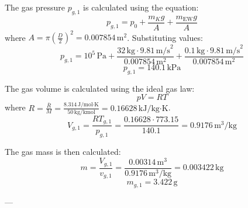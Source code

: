 The gas pressure \( p_{g,1} \) is calculated using the equation:  
\[
p_{g,1} = p_0 + \frac{m_K g}{A} + \frac{m_{\text{EW}} g}{A}
\]  
where \( A = \pi \left(\frac{D}{2}\right)^2 = 0.007854 \, \text{m}^2 \). Substituting values:  
\[
p_{g,1} = 10^5 \, \text{Pa} + \frac{32 \, \text{kg} \cdot 9.81 \, \text{m/s}^2}{0.007854 \, \text{m}^2} + \frac{0.1 \, \text{kg} \cdot 9.81 \, \text{m/s}^2}{0.007854 \, \text{m}^2}
\]  
\[
p_{g,1} = 140.1 \, \text{kPa}
\]  

The gas volume is calculated using the ideal gas law:  
\[
p V = R T
\]  
where \( R = \frac{\bar{R}}{M} = \frac{8.314 \, \text{J/mol·K}}{50 \, \text{kg/kmol}} = 0.16628 \, \text{kJ/kg·K} \).  
\[
V_{g,1} = \frac{R T_{g,1}}{p_{g,1}} = \frac{0.16628 \cdot 773.15}{140.1} = 0.9176 \, \text{m}^3/\text{kg}
\]  

The gas mass is then calculated:  
\[
m = \frac{V_{g,1}}{v_{g,1}} = \frac{0.00314 \, \text{m}^3}{0.9176 \, \text{m}^3/\text{kg}} = 0.003422 \, \text{kg}
\]  
\[
m_{g,1} = 3.422 \, \text{g}
\]  

---